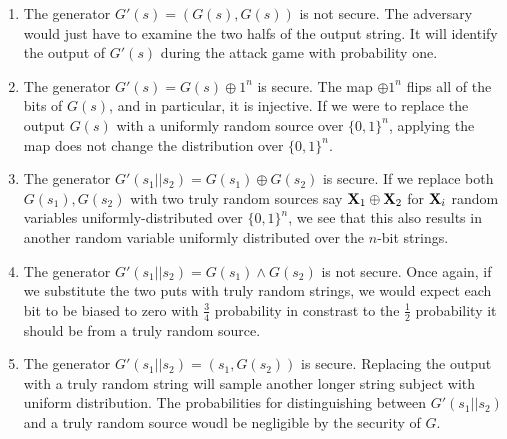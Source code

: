 \documentclass[11pt]{article}
\begin{document}
\begin{enumerate}[label=(\alph*)]
  \item The generator $G'(s) = (G(s), G(s))$ is not secure. The adversary would just have to examine the two halfs of the output string. It will identify the output of $G'(s)$ during the attack game with probability one.
  \item The generator $G'(s) = G(s) \oplus 1^n$ is secure. The map $\oplus 1^n$ flips all of the bits of $G(s)$, and in particular, it is injective. If we were to replace the output $G(s)$ with a uniformly random source over $\{0,1\}^n$, applying the map does not change the distribution over $\{0,1\}^n$.
  \item The generator $G'(s_1||s_2) = G(s_1) \oplus G(s_2)$ is secure. If we replace both $G(s_1), G(s_2)$ with two truly random sources say ${\bf X}_1 \oplus {\bf X}_2$ for ${\bf X}_i$ random variables uniformly-distributed over $\{0,1\}^n$, we see that this also results in another random variable uniformly distributed over the $n$-bit strings.

  \item The generator $G'(s_1||s_2) = G(s_1) \wedge G(s_2)$ is not secure. Once again, if we substitute the two puts with truly random strings, we would expect each bit to be biased to zero with $\frac{3}{4}$ probability in constrast to the $\frac{1}{2}$ probability it should be from a truly random source.
  \item The generator $G'(s_1||s_2) = (s_1, G(s_2))$ is secure. Replacing the output with a truly random string will sample another longer string subject with uniform distribution. The probabilities for distinguishing between $G'(s_1||s_2)$ and a truly random source woudl be negligible by the security of $G$.
\end{enumerate}
\end{document}
